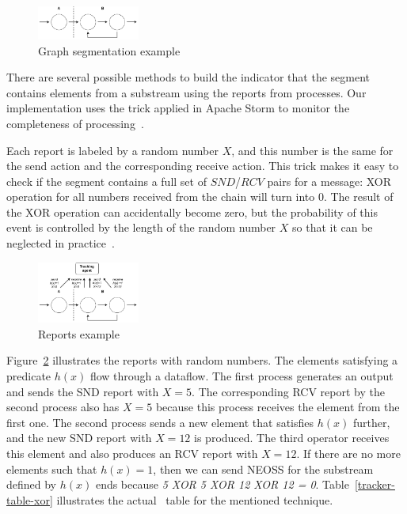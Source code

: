 \begin{figure}[t]
  \centering
  \includegraphics[width=0.3\textwidth]{pics/segments-example.pdf}
  \caption{Graph segmentation example}
  \label{fig:tracker-acker-comparison}
\end{figure}

There are several possible methods to build the indicator that the segment contains elements from a substream using the reports from processes. Our implementation uses the trick applied in Apache Storm to monitor the completeness of processing~\cite{apache:storm:acker}. 

Each report is labeled by a random number $X$, and this number is the same for the send action and the corresponding receive action. This trick makes it easy to check if the segment contains a full set of $SND$/$RCV$ pairs for a message: XOR operation for all numbers received from the chain will turn into 0. The result of the XOR operation can accidentally become zero, but the probability of this event is controlled by the length of the random number $X$ so that it can be neglected in practice~\cite{apache:storm:acker}.

\begin{figure}[t]
  \centering
  \includegraphics[width=0.3\textwidth]{pics/tracker-segments-example.pdf}
  \caption{Reports example}
  \label{fig:tracker-reports}
\end{figure}

Figure~\ref{fig:tracker-reports} illustrates the reports with random numbers. The elements satisfying a predicate $h(x)$ flow through a dataflow. The first process generates an output and sends the SND report with $X=5$. The corresponding RCV report by the second process also has $X=5$ because this process receives the element from the first one. The second process sends a new element that satisfies $h(x)$ further, and the new SND report with $X=12$ is produced. The third operator receives this element and also produces an RCV report with $X=12$. If there are no more elements such that $h(x)=1$, then we can send NEOSS for the substream defined by $h(x)$ ends because {\em 5 XOR 5 XOR 12 XOR 12 = 0}. Table~\ref{tracker-table-xor} illustrates the actual \tracker\ table for the mentioned technique.


